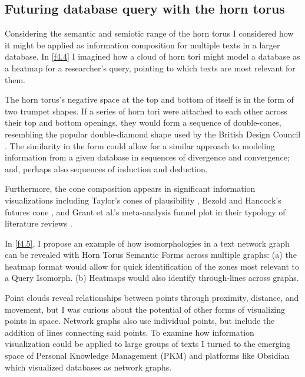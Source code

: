 \subsection{Futuring database query with the horn torus}
Considering the semantic and semiotic range of the horn torus I considered how it might be applied as information composition for multiple texts in a larger database. In \autoref{f4.4} I imagined how a cloud of horn tori might model a database as a heatmap for a researcher’s query, pointing to which texts are most relevant for them. 

The horn torus’s negative space at the top and bottom of itself is in the form of two trumpet shapes. If a series of horn tori were attached to each other across their top and bottom openings, they would form a sequence of double-cones, resembling the popular double-diamond shape used by the British Design Council \citep{british_design_council_framework_nodate}. The similarity in the form could allow for a similar approach to modeling information from a given database in sequences of divergence and convergence; and, perhaps also sequences of induction and deduction. 

Furthermore, the cone composition appears in significant information visualizations including Taylor’s cones of plausibility \citep[p. 14]{taylor_creating_1990}, Bezold and Hancock’s futures cone \citep[p. 73]{bezold_overview_1993}, and Grant et al.’s meta-analysis funnel plot in their typology of literature reviews \citep[p. 94-95]{grant_typology_2009}.

In \autoref{f4.5}, I propose an example of how isomorphologies in a text network graph can be revealed with Horn Torus Semantic Forms across multiple graphs: (a) the heatmap format would allow for quick identification of the zones most relevant to a Query Isomorph. (b) Heatmaps would also identify through-lines across graphs. 
 

Point clouds reveal relationships between points through proximity, distance, and movement, but I was curious about the potential of other forms of visualizing points in space. Network graphs also use individual points, but include the addition of lines connecting said points. To examine how information visualization could be applied to large groups of texts I turned to the emerging space of Personal Knowledge Management (PKM) and platforms like Obsidian which visualized databases as network graphs.
 

